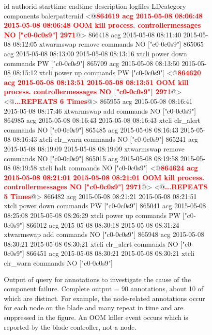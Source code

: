 \begin{figure*}
\begin{annol}
id	authorid	starttime	endtime	description	logfiles	LDcategory	components	balerpatternid
<@\textbf{\textcolor{red}{864619	acg	2015-05-08 08:06:48	2015-05-08 08:06:48	OOM kill process.		controllermessages	NO	["c0-0c0s9"]	2971}}@>
866418	acg	2015-05-08 08:11:40	2015-05-08 08:12:05	xtwarmswap remove	commands	NO	["c0-0c0s9"]
865065	acg	2015-05-08 08:13:00	2015-05-08 08:13:16	xtcli power down	commands	PW	["c0-0c0s9"]
865709	acg	2015-05-08 08:13:50	2015-05-08 08:15:12	xtcli power up	commands	PW	["c0-0c0s9"]
<@\textbf{\textcolor{red}{864620	acg	2015-05-08 08:13:51     2015-05-08 08:13:51	OOM kill process.		controllermessages	NO	["c0-0c0s9"]	2971}}@>
<@\textbf{\textcolor{red}{...REPEATS 6 Times}}@>
865955	acg	2015-05-08 08:16:41	2015-05-08 08:17:46	xtwarmswap add	commands	NO	["c0-0c0s9"]
864985	acg	2015-05-08 08:16:43	2015-05-08 08:16:43	xtcli clr_alert	commands	NO	["c0-0c0s9"]
865485	acg	2015-05-08 08:16:43	2015-05-08 08:16:43	xtcli clr_warn	commands	NO	["c0-0c0s9"]
865241	acg	2015-05-08 08:19:09	2015-05-08 08:19:09	xtwarmswap remove	commands	NO	["c0-0c0s9"]
865015	acg	2015-05-08 08:19:58	2015-05-08 08:19:58	xtcli halt	commands	NO	["c0-0c0s9"]
<@\textbf{\textcolor{red}{864624	acg	2015-05-08 08:21:01	2015-05-08 08:21:01	OOM kill process.	controllermessages	NO	["c0-0c0s9"]	2971}}@>
<@\textbf{\textcolor{red}{...REPEATS 5 Times}}@>
866482	acg	2015-05-08 08:21:21	2015-05-08 08:21:51	xtcli power down	commands	PW	["c0-0c0s9"]
865041	acg	2015-05-08 08:25:08	2015-05-08 08:26:29	xtcli power up	commands	PW	["c0-0c0s9"]
866012	acg	2015-05-08 08:30:18	2015-05-08 08:31:24	xtwarmswap add	commands	NO	["c0-0c0s9"]
865948	acg	2015-05-08 08:30:21	2015-05-08 08:30:21	xtcli clr_alert	commands	NO	["c0-0c0s9"]
866451	acg	2015-05-08 08:30:21	2015-05-08 08:30:21	xtcli clr_warn	commands	NO	["c0-0c0s9"]
\end{annol}
\caption{Output of query for annotations to investigate the cause of the component failure. Complete output = 90 annotations, about 10 of which are distinct. For example, the
node-related annotations occur for each node on the blade and many repeat in time and are suppressed in the figure. An OOM killer event occurs which is reported by the blade
controller, not a node.}
\label{f:c0-0c0s9q}
\end{figure*}


